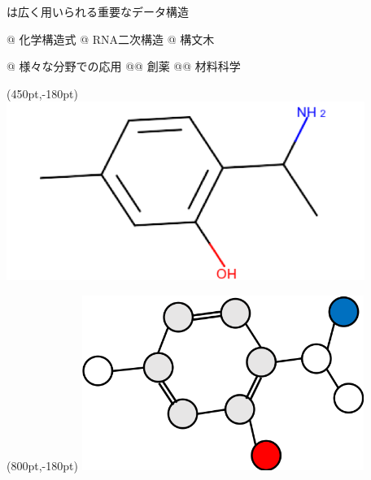 \begin{tcolorbox}[title={\large 背景}]
	は広く用いられる重要なデータ構造
	\vspace{15pt}
	\begin{easylist}[itemize]
	@ 化学構造式
	\vspace{10pt}
	@ RNA二次構造
	\vspace{10pt}
	@ 構文木 \\
	\end{easylist}
	\vspace{20pt}

	\vspace{15pt}
	\begin{easylist}[itemize]
	@ 様々な分野での応用
	\vspace{10pt}
	@@ 創薬
	\vspace{10pt}
	@@ 材料科学
	\end{easylist}
	\vspace{105pt}
	\begin{textblock*}{\textwidth}(450pt,-180pt)
		\includegraphics[width=330pt]{img/chemical.png}
	\end{textblock*}
	\begin{textblock*}{\textwidth}(800pt,-180pt)
		\includegraphics[width=260pt]{img/chemical_graph.png}
	\end{textblock*}
\end{tcolorbox}
